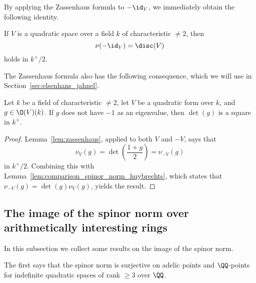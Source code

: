 By applying the Zassenhaus formula to $-\id_V$, we immediately obtain the following identity.

\begin{lemma}\label{lem:spinor_norm_-id}
If $V$ is a quadratic space over a field $k$ of characteristic $\neq 2$, then
$$
\nu(-\id_V) = \disc(V)
$$
holds in $k^{\times}\!/2$.
\end{lemma}

The Zassenhaus formula also has the following consequence, which we will use in Section~\ref{sec:elsenhans_jahnel}.
\begin{lemma}\label{lem:determinant_orthogonal_transformation}
Let $k$ be a field of characteristic $\neq 2$, let $V$ be a quadratic form over $k$, and $g \in \O(V)(k)$. If $g$ does not have $-1$ as an eigenvalue, then $\det(g)$ is a square in $k^{\times}$.
\end{lemma}
\begin{proof}
Lemma~\ref{lem:zassenhaus}, applied to both $V$ and $-V$, says that
$$
\nu_{V}(g) = \det\left(\frac{1 + g}{2} \right) = \nu_{-V}(g)
$$
in $k^{\times}\!/2$. Combining this with Lemma~\ref{lem:comparison_spinor_norm_huybrechts}, which states that $\nu_{-V}(g) = \det(g) \nu_V(g)$, yields the result.
\end{proof}


\subsection{The image of the spinor norm over arithmetically interesting rings}\label{sec:img_spinor}
In this subsection we collect some results on the image of the spinor norm.

The first says that the spinor norm is surjective on adelic points and $\QQ$-points for indefinite quadratic spaces of rank $\geq 3$ over $\QQ$.


